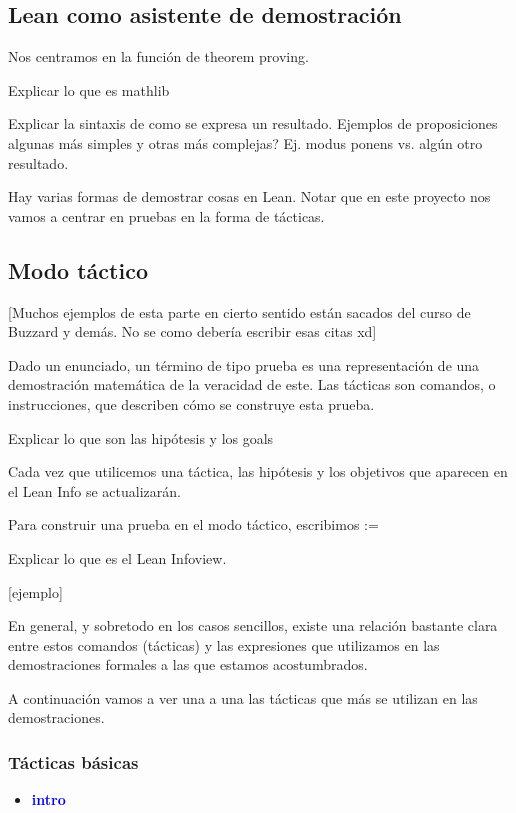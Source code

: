 \documentclass{article}
\begin{document}
\subsection{Lean como asistente de demostración}

Nos centramos en la función de theorem proving.

Explicar lo que es mathlib

Explicar la sintaxis de como se expresa un resultado. Ejemplos de proposiciones algunas más simples y otras más complejas? Ej. modus ponens vs. algún otro resultado.

Hay varias formas de demostrar cosas en Lean. Notar que en este proyecto nos vamos a centrar en pruebas en la forma de tácticas.


\subsection{Modo táctico}

[Muchos ejemplos de esta parte en cierto sentido están sacados del curso de Buzzard y demás. No se como debería escribir esas citas xd]

Dado un enunciado, un término de tipo prueba es una representación de una demostración matemática de la veracidad de este. Las tácticas son comandos, o instrucciones, que describen cómo se construye esta prueba.

Explicar lo que son las hipótesis y los goals

Cada vez que utilicemos una táctica, las hipótesis y los objetivos que aparecen en el Lean Info se actualizarán.

Para construir una prueba en el modo táctico, escribimos :=

Explicar lo que es el Lean Infoview.

[ejemplo]

En general, y sobretodo en los casos sencillos, existe una relación bastante clara entre estos comandos (tácticas) y las expresiones que utilizamos en las demostraciones formales a las que estamos acostumbrados.

A continuación vamos a ver una a una las tácticas que más se utilizan en las demostraciones.

\subsubsection{Tácticas básicas}

\begin{itemize}
    \item \textbf{\textcolor{blue}{intro}}
\end{itemize}
    
\end{document}
